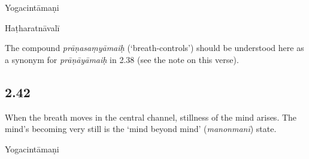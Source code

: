 \begin{ekdosis}
\begin{sources}[hp02_041]
\end{sources}

\begin{testimonia}[hp02_041]
Yogacintāmaṇi

\begin{versinnote}
\end{versinnote}

Haṭharatnāvalī

\begin{versinnote}
\end{versinnote}
\end{testimonia}

\begin{philcomm}[hp02_041]
The compound \emph{prāṇasaṃyāmaiḥ} (‘breath-controls’) should be understood here as a synonym for \emph{prāṇāyāmaiḥ}  in 2.38 (see the note on this verse).
\end{philcomm}

\subsection*{2.42}
\begin{translation}[hp02_042]
When the breath moves in the central channel, stillness of the mind arises. The mind’s becoming very still is the ‘mind beyond mind’ (\emph{manonmanī}) state.
\end{translation}

\begin{sources}[hp02_042]
\end{sources}

\begin{testimonia}[hp02_042]
Yogacintāmaṇi

\begin{versinnote}
\end{versinnote}


\end{testimonia}
\end{ekdosis}
